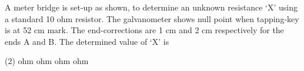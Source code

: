 
\item A meter bridge is set-up as shown, to determine an unknown resistance `X' using a standard 10 ohm resistor. The galvanometer shows null point when tapping-key is at 52 cm mark. The end-corrections are 1 cm and 2 cm respectively for the ends A and B. The determined value of `X' is
    \begin{center}
    \end{center}
    \begin{tasks}(2)
         ohm
         ohm
         ohm
         ohm
    \end{tasks}
